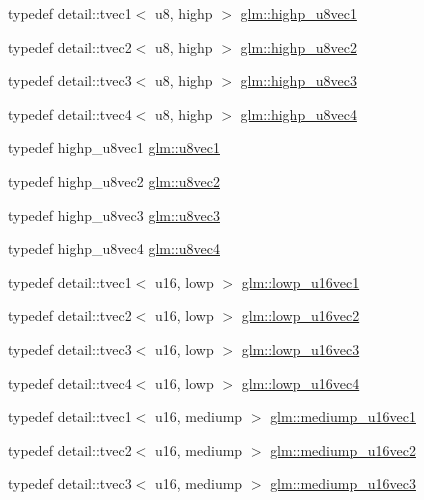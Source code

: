 \begin{CompactItemize}
\item 
typedef detail::tvec1$<$ u8, highp $>$ \hyperlink{group__gtc__type__precision_g8e7e9156357a2b748fe39702c3bdbeec}{glm::highp\_\-u8vec1}
\item 
typedef detail::tvec2$<$ u8, highp $>$ \hyperlink{group__gtc__type__precision_g9aed4b3bacd37a43ec369bcf76be144a}{glm::highp\_\-u8vec2}
\item 
typedef detail::tvec3$<$ u8, highp $>$ \hyperlink{group__gtc__type__precision_g52bdf53a4f05023c13a9b817526d249f}{glm::highp\_\-u8vec3}
\item 
typedef detail::tvec4$<$ u8, highp $>$ \hyperlink{group__gtc__type__precision_g3a46f19674a65471988b41ffdaa834c5}{glm::highp\_\-u8vec4}
\item 
typedef highp\_\-u8vec1 \hyperlink{group__gtc__type__precision_gf0155c700da11c0b5518a777d1f0cd23}{glm::u8vec1}
\item 
typedef highp\_\-u8vec2 \hyperlink{group__gtc__type__precision_ga7ea171741c23b5bb2a3c91fe8c84e8a}{glm::u8vec2}
\item 
typedef highp\_\-u8vec3 \hyperlink{group__gtc__type__precision_g3b4624ecd0485fe5143f956864e7934e}{glm::u8vec3}
\item 
typedef highp\_\-u8vec4 \hyperlink{group__gtc__type__precision_gaf6b3d127698d893de8652deedfd3d9b}{glm::u8vec4}
\item 
typedef detail::tvec1$<$ u16, lowp $>$ \hyperlink{group__gtc__type__precision_g25464b09e8e3c63f6896605e0c997eb1}{glm::lowp\_\-u16vec1}
\item 
typedef detail::tvec2$<$ u16, lowp $>$ \hyperlink{group__gtc__type__precision_gff5ca5a8bc621bb8f4b28f046c0de508}{glm::lowp\_\-u16vec2}
\item 
typedef detail::tvec3$<$ u16, lowp $>$ \hyperlink{group__gtc__type__precision_g74d5491c9ee66d068309d200601e907b}{glm::lowp\_\-u16vec3}
\item 
typedef detail::tvec4$<$ u16, lowp $>$ \hyperlink{group__gtc__type__precision_gb0210f390e7d75fa8eb42128a05ff23a}{glm::lowp\_\-u16vec4}
\item 
typedef detail::tvec1$<$ u16, mediump $>$ \hyperlink{group__gtc__type__precision_gcb35d25d662b2a6396d094197ca834f0}{glm::mediump\_\-u16vec1}
\item 
typedef detail::tvec2$<$ u16, mediump $>$ \hyperlink{group__gtc__type__precision_g93fe5ddc21391f0334eb3a60b76c390b}{glm::mediump\_\-u16vec2}
\item 
typedef detail::tvec3$<$ u16, mediump $>$ \hyperlink{group__gtc__type__precision_g82dbfd263ced8d03577008a3ef096598}{glm::mediump\_\-u16vec3}

\end{CompactItemize}
